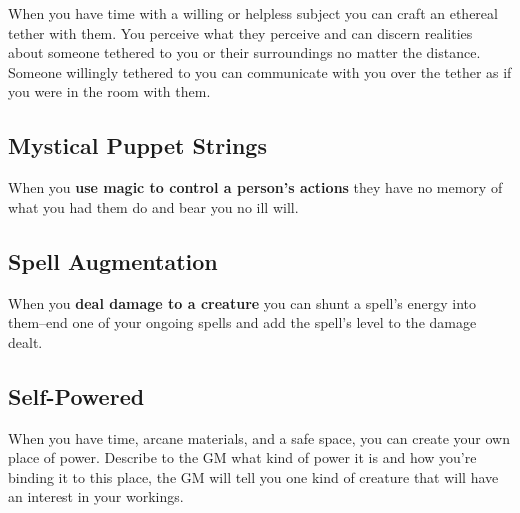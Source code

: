 When you have time with a willing or helpless subject you can craft an ethereal tether with them. You perceive what they perceive and can discern realities about someone tethered to you or their surroundings no matter the distance. Someone willingly tethered to you can communicate with you over the tether as if you were in the room with them.
\subsection{Mystical Puppet Strings}

When you \textbf{use magic to control a person's actions}
they have no memory of what you had them do and bear you no ill will.
\subsection{Spell Augmentation}

When you \textbf{deal damage to a creature}
you can shunt a spell's energy into them--end one of your ongoing spells and add the spell's level to the damage dealt.
\subsection{Self-Powered}

When you have time, arcane materials, and a safe space, you can create your own place of power. Describe to the GM what kind of power it is and how you're binding it to this place, the GM will tell you one kind of creature that will have an interest in your workings.



